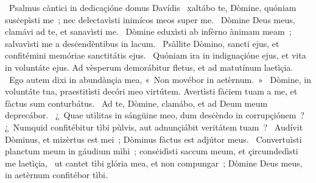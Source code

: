{~Psalmus càntici in dedicaçióne domus Davídis}
{%
~xaltábo te, Dòmine, quóniam susċepìsti me~; nec delectavìsti inimícos meos super me.
~Dòmine Deus meus, clamávi ad te, et sanavìsti me.
~Dòmine eduxìsti ab infèrno ànimam meam~; salvavìsti me a desċendèntibus in lacum.
~Psàllite Dòmino, sancti ejus, et confitémini memóriae sanctitátis ejus.
~Quóniam ira in indignaçióne ejus, et vita in voluntáte ejus. Ad vèsperum demorábitur fletus, et ad matutínum laetìçia.
~Ego autem dixi in abundànçia mea, «~Non movébor in aetèrnum.~»
~Dòmine, in voluntáte tua, praestitìsti decóri meo virtútem. Avertìsti fàċiem tuam a me, et fàctus sum conturbátus.
~Ad te, Dòmine, clamábo, et ad Deum meum deprecábor.
~¿~Quae utìlitas in sángüine meo, dum desċèndo in corrupçiónem~? ¿~Numquid confitébitur tìbi pùlvis, aut adnunçiábit veritátem tuam~?
~Audívit Dòminus, et mizèrtus est mei~; Dòminus fàctus est adjútor meus.
~Convertuìsti planctum meum in gáudium mìhi~; consċidìsti saccum meum, et çircumdedìsti me laetìçia,
~ut cantet tìbi glória mea, et non compungar~; Dòmine Deus meus, in aetèrnum confitébor tìbi.
}
